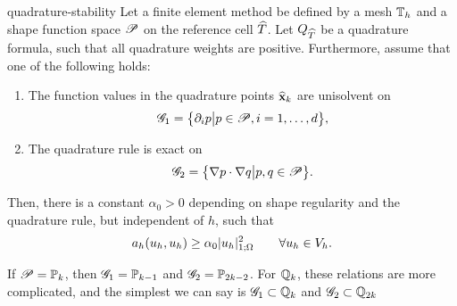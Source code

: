 \begin{Lemma}{quadrature-stability}
  Let a finite element method be defined by a mesh $\mesh_h$ and a
  shape function space $\shapespace$ on the reference cell $\refcell$.
  Let $Q_{\refcell}$ be a quadrature formula, such that all quadrature
  weights are positive. Furthermore, assume that one of the following
  holds:
  \begin{enumerate}
  \item The function values in the quadrature points $\refvx_k$ are
    unisolvent on
    \begin{gather}
      \mathscr G_1
      = \bigl\{ \d_i p\big| p\in \shapespace, i=1,\dots,d\bigr\},
    \end{gather}
  \item The quadrature rule is exact on
    \begin{gather}
      \mathscr G_2
      = \bigl\{ \nabla p\cdot \nabla q \big| p,q\in \shapespace \bigr\}.
    \end{gather}
  \end{enumerate}
  Then, there is a constant $\alpha_0>0$ depending on shape regularity
  and the quadrature rule, but independent of $h$, such that
  \begin{gather}
    a_h(u_h,u_h) \ge \alpha_0 \snorm{u_h}_{1;\domain}^2
    \qquad\forall u_h\in V_h.
  \end{gather}
\end{Lemma}

\begin{remark}
  If $\shapespace = \P_k$, then $\mathscr G_1 = \P_{k-1}$ and
  $\mathscr G_2 = \P_{2k-2}$. For $\Q_k$, these relations are more
  complicated, and the simplest we can say is
  $\mathscr G_1 \subset \Q_k$ and $\mathscr G_2 \subset \Q_{2k}$
\end{remark}

